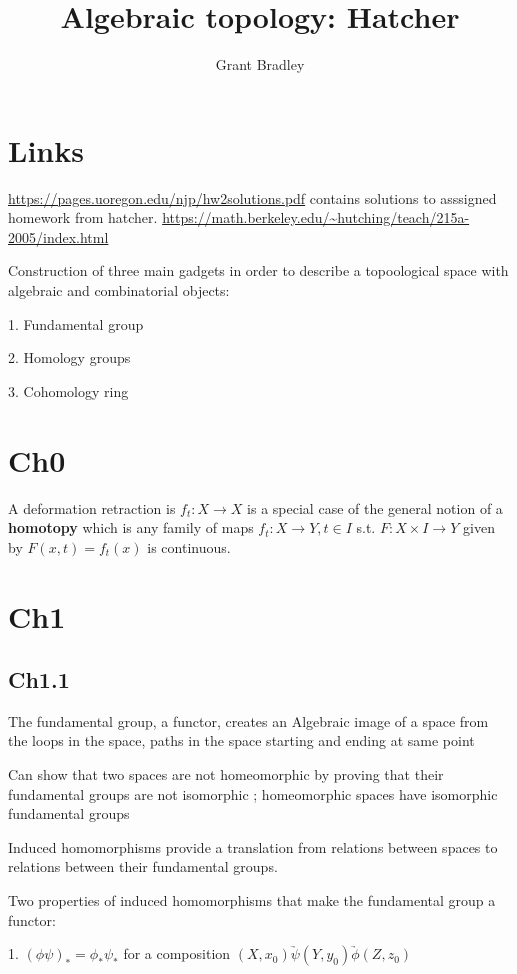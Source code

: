 \documentclass[11pt]{article}
\title{Algebraic topology: Hatcher}
\author{Grant Bradley}
\begin{document}
\maketitle
\tableofcontents
\chapter{Links}
\url{https://pages.uoregon.edu/njp/hw2solutions.pdf} contains solutions to asssigned homework from hatcher.
\url{https://math.berkeley.edu/~hutching/teach/215a-2005/index.html}

Construction of three main gadgets in order to describe a topoological space with algebraic and combinatorial objects:

1. Fundamental group

2. Homology groups

3. Cohomology ring 



\chapter{Ch0}
A deformation retraction is $f_t : X \rightarrow X$ is a special case of the general notion of a \textbf{homotopy} which is any
family of maps $f_t : X \rightarrow Y , t \in I$ s.t. $F: X \times I \rightarrow Y$ given by $F(x,t) = f_t(x)$ is continuous. 



\chapter{Ch1}
\section{Ch1.1}
The fundamental group, a functor, creates an Algebraic image of a space from the loops in the space, paths in the space starting and ending at same point

Can show that two spaces are not homeomorphic by proving that their fundamental groups are not isomorphic ; 
homeomorphic spaces have isomorphic fundamental groups

Induced homomorphisms provide a translation from relations between spaces to relations between their fundamental groups.

Two properties of induced homomorphisms that make the fundamental group a functor:

1. $(\phi\psi)_* = \phi_* \psi_*$ for a composition $(X,x_0)  \underrightarrow{\psi}  (Y,y_0) \underrightarrow{\phi} (Z,z_0)$
\end{document}
